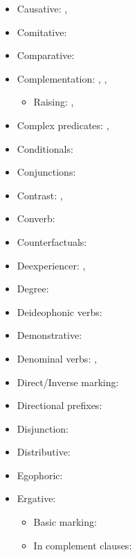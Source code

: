 \documentclass[oldfontcommands,oneside,a4paper,11pt]{article}
\begin{document}
\begin{itemize}
\item Causative: \citet{jacques15causative}, \citet[273-275]{jacques16complementation}
\item Comitative: \citet[272-4]{jacques14linking}
\item Comparative: \citet{jacques16comparative}
\item Complementation: \citet{jacques08},  \citet{jacques17sketch}, \citet{jacques16complementation}
\begin{itemize}
\item  Raising: \citet{jacques15causative}, \citet[260]{jacques16complementation}
\end{itemize}
\item Complex predicates: \citet{jacques12incorp}, \citet{jacques16complementation}
\item Conditionals:  \citet[296-300]{jacques14linking}
\item Conjunctions:  \citet[276-7]{jacques14linking}
\item Contrast:  \citet[315-8]{jacques14linking}, \citet{jacques16comparative}
\item Converb:  \citet[269-272;307-8;321-2]{jacques14linking}
\item Counterfactuals:  \citet[301-2]{jacques14linking}
\item Deexperiencer: \citet[216-7]{jacques12demotion}, \citet{jacques14antipassive}
\item Degree: \citet{jacques16comparative}
\item Deideophonic verbs: \citet[278-282]{japhug14ideophones}
\item Demonstrative: \citet[627]{jacques17sketch}
\item Denominal verbs:  \citet{jacques12incorp}, \citet{jacques14antipassive}
\item Direct/Inverse marking: \citet{jacques10inverse}
\item Directional prefixes:  \citet[267-8]{jacques14linking}
\item Disjunction:  \citet[318-9]{jacques14linking}
\item Distributive: \citet{jacques16comparative}
\item Egophoric: \citet[617-620]{jacques17sketch}
\item Ergative:   \citet{jacques16comparative}
\begin{itemize}
\item Basic marking: \citet[131-2]{jacques10inverse} 
\item In complement clauses: \citet[260-261]{jacques16complementation}

\end{itemize}
\end{itemize}
\end{document}
